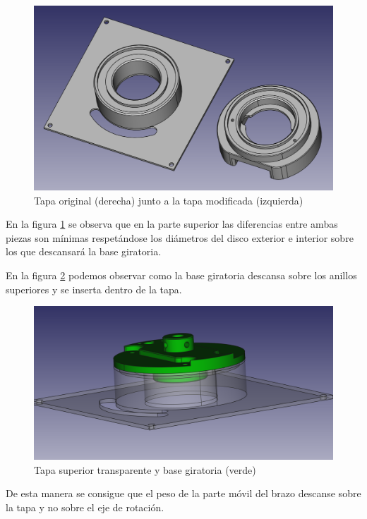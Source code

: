  \begin{figure}[H]
    \centering
    \includegraphics[width=.9\linewidth]{pictures/DosTapas.png}
    \caption{Tapa original (derecha) junto a la tapa modificada (izquierda)}
    \label{fig:tapas_caja}
\end{figure}

En la figura \ref{fig:tapas_caja} se observa que en la parte superior las diferencias entre ambas piezas son mínimas respetándose los diámetros del disco exterior e interior sobre los que descansará la base giratoria.

En la figura \ref{fig:tapas_caja_con_disco} podemos observar como la base giratoria descansa sobre los anillos superiores y se inserta dentro de la tapa.

 \begin{figure}[H]
    \centering
    \includegraphics[width=.9\linewidth]{pictures/TapaSuperiorConDisco.png}
    \caption{Tapa superior transparente y base giratoria (verde)}
    \label{fig:tapas_caja_con_disco}
\end{figure}

De esta manera se consigue que el peso de la parte móvil del brazo descanse sobre la tapa y no sobre el eje de rotación.
